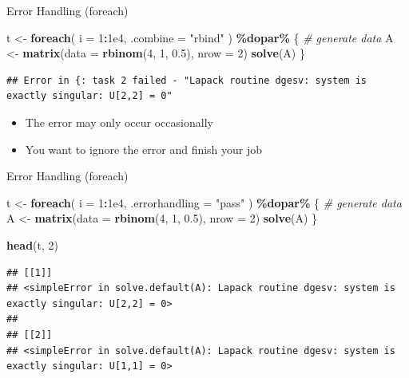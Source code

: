 \documentclass[
  ignorenonframetext,
]{beamer}
\newenvironment{Shaded}{\begin{snugshade}}{\end{snugshade}}
\newcommand{\AttributeTok}[1]{\textcolor[rgb]{0.13,0.29,0.53}{#1}}
\newcommand{\CommentTok}[1]{\textcolor[rgb]{0.56,0.35,0.01}{\textit{#1}}}
\newcommand{\DecValTok}[1]{\textcolor[rgb]{0.00,0.00,0.81}{#1}}
\newcommand{\FloatTok}[1]{\textcolor[rgb]{0.00,0.00,0.81}{#1}}
\newcommand{\FunctionTok}[1]{\textcolor[rgb]{0.13,0.29,0.53}{\textbf{#1}}}
\newcommand{\NormalTok}[1]{#1}
\newcommand{\OtherTok}[1]{\textcolor[rgb]{0.56,0.35,0.01}{#1}}
\newcommand{\SpecialCharTok}[1]{\textcolor[rgb]{0.81,0.36,0.00}{\textbf{#1}}}
\newcommand{\StringTok}[1]{\textcolor[rgb]{0.31,0.60,0.02}{#1}}
\providecommand{\tightlist}{%
  \setlength{\itemsep}{0pt}\setlength{\parskip}{0pt}}
\begin{document}
\begin{frame}[fragile]{Error Handling (foreach)}
\protect{}\label{error-handling-foreach}
\begin{Shaded}
\begin{Highlighting}[]
\NormalTok{t }\OtherTok{\textless{}{-}} \FunctionTok{foreach}\NormalTok{(}
  \AttributeTok{i =} \DecValTok{1}\SpecialCharTok{:}\FloatTok{1e4}\NormalTok{, }\AttributeTok{.combine =} \StringTok{"rbind"}
\NormalTok{) }\SpecialCharTok{\%dopar\%}\NormalTok{ \{}
  \CommentTok{\# generate data}
\NormalTok{  A }\OtherTok{\textless{}{-}} \FunctionTok{matrix}\NormalTok{(}\AttributeTok{data =} \FunctionTok{rbinom}\NormalTok{(}\DecValTok{4}\NormalTok{, }\DecValTok{1}\NormalTok{, }\FloatTok{0.5}\NormalTok{), }\AttributeTok{nrow =} \DecValTok{2}\NormalTok{)}
  \FunctionTok{solve}\NormalTok{(A)}
\NormalTok{\}}
\end{Highlighting}
\end{Shaded}

\begin{verbatim}
## Error in {: task 2 failed - "Lapack routine dgesv: system is exactly singular: U[2,2] = 0"
\end{verbatim}

\begin{itemize}
\tightlist
\item
  The error may only occur occasionally
\item
  You want to ignore the error and finish your job
\end{itemize}
\end{frame}

\begin{frame}[fragile]{Error Handling (foreach)}
\protect{}\label{error-handling-foreach-1}
\begin{Shaded}
\begin{Highlighting}[]
\NormalTok{t }\OtherTok{\textless{}{-}} \FunctionTok{foreach}\NormalTok{(}
  \AttributeTok{i =} \DecValTok{1}\SpecialCharTok{:}\FloatTok{1e4}\NormalTok{,}
  \AttributeTok{.errorhandling =} \StringTok{"pass"}
\NormalTok{) }\SpecialCharTok{\%dopar\%}\NormalTok{ \{}
  \CommentTok{\# generate data}
\NormalTok{  A }\OtherTok{\textless{}{-}} \FunctionTok{matrix}\NormalTok{(}\AttributeTok{data =} \FunctionTok{rbinom}\NormalTok{(}\DecValTok{4}\NormalTok{, }\DecValTok{1}\NormalTok{, }\FloatTok{0.5}\NormalTok{), }\AttributeTok{nrow =} \DecValTok{2}\NormalTok{)}
  \FunctionTok{solve}\NormalTok{(A)}
\NormalTok{\}}

\FunctionTok{head}\NormalTok{(t, }\DecValTok{2}\NormalTok{)}
\end{Highlighting}
\end{Shaded}

\begin{verbatim}
## [[1]]
## <simpleError in solve.default(A): Lapack routine dgesv: system is exactly singular: U[2,2] = 0>
## 
## [[2]]
## <simpleError in solve.default(A): Lapack routine dgesv: system is exactly singular: U[1,1] = 0>
\end{verbatim}
\end{frame}
\end{document}

